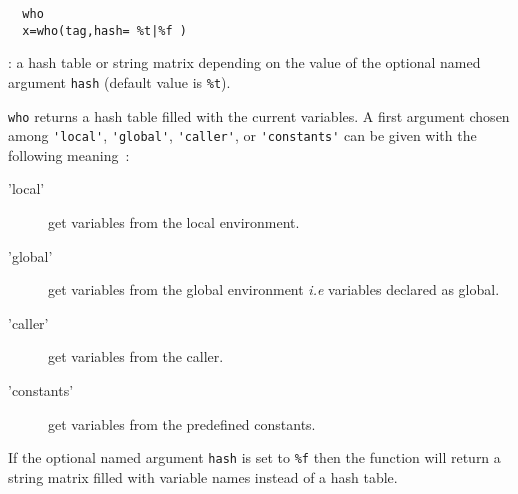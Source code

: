 \begin{mandesc}
\end{mandesc}
\label{who}
\begin{calling_sequence}
\begin{verbatim}
  who
  x=who(tag,hash= %t|%f )  
\end{verbatim}
\end{calling_sequence}
\begin{parameters}
  \begin{varlist}
    : a hash table or string matrix depending on the value of 
    the optional named argument \verb+hash+ (default value is \verb+%t+).
  \end{varlist}
\end{parameters}
\begin{mandescription}
  \verb!who! returns a hash table filled with the current variables. 
  A first argument chosen among \verb+'local'+,  \verb+'global'+,
  \verb+'caller'+, or  \verb+'constants'+ can be given with the following 
  meaning~:
\begin{description}
  \item['local'] get variables from the local environment. 
  \item['global'] get variables from the global environment \emph{i.e} 
    variables declared as global.
  \item['caller'] get variables from the caller. 
  \item['constants'] get variables from the predefined constants. 
\end{description}
  If the optional 
  named argument \verb+hash+ is set to \verb+%f+ then the function will 
  return a string matrix filled with variable names instead of a hash table.
\end{mandescription} 


